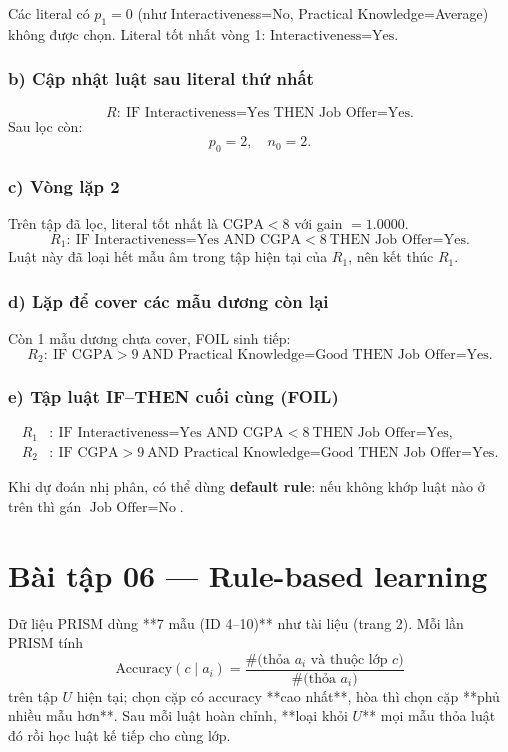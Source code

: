 Các literal có \(p_1=0\) (như Interactiveness=No, Practical Knowledge=Average)
không được chọn.
Literal tốt nhất vòng 1: \(\text{Interactiveness=Yes}\).

\subsubsection*{b) Cập nhật luật sau literal thứ nhất}

\[
R:\ \text{IF Interactiveness=Yes THEN Job Offer=Yes}.
\]
Sau lọc còn:
\[
p_0=2,\quad n_0=2.
\]

\subsubsection*{c) Vòng lặp 2}

Trên tập đã lọc, literal tốt nhất là \(\text{CGPA}<8\) với gain \(=1.0000\).
\[
R_1:\ \text{IF Interactiveness=Yes AND CGPA}<8\ \text{THEN Job Offer=Yes}.
\]
Luật này đã loại hết mẫu âm trong tập hiện tại của \(R_1\), nên kết thúc \(R_1\).

\subsubsection*{d) Lặp để cover các mẫu dương còn lại}

Còn 1 mẫu dương chưa cover, FOIL sinh tiếp:
\[
R_2:\ \text{IF CGPA}>9\ \text{AND Practical Knowledge=Good THEN Job Offer=Yes}.
\]

\subsubsection*{e) Tập luật IF--THEN cuối cùng (FOIL)}
\[
\begin{aligned}
R_1&:\ \text{IF Interactiveness=Yes AND CGPA}<8\ \text{THEN Job Offer=Yes},\\
R_2&:\ \text{IF CGPA}>9\ \text{AND Practical Knowledge=Good THEN Job Offer=Yes}.
\end{aligned}
\]

Khi dự đoán nhị phân, có thể dùng \textbf{default rule}: nếu không khớp luật nào ở trên
thì gán \(\text{Job Offer}=\text{No}\).
\section*{Bài tập 06 --- Rule-based learning}

Dữ liệu PRISM dùng **7 mẫu (ID 4--10)** như tài liệu (trang 2). Mỗi lần PRISM tính
\[
\text{Accuracy}(c \mid a_i)=\frac{\#\text{(thỏa }a_i\text{ và thuộc lớp }c)}{\#\text{(thỏa }a_i)}
\]
trên tập \(U\) hiện tại; chọn cặp có accuracy **cao nhất**, hòa thì chọn cặp **phủ nhiều mẫu hơn**. Sau mỗi luật hoàn chỉnh, **loại khỏi \(U\)** mọi mẫu thỏa luật đó rồi học luật kế tiếp cho cùng lớp.

